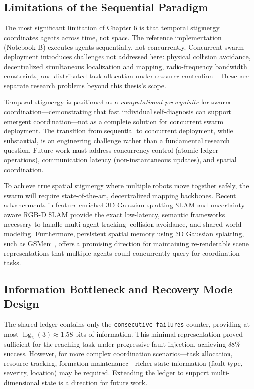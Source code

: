 \documentclass[12pt,a4paper,oneside]{report}
\begin{document}
\subsection{Limitations of the Sequential Paradigm}

The most significant limitation of Chapter 6 is that temporal stigmergy coordinates agents across time, not space. The reference implementation (Notebook B) executes agents sequentially, not concurrently. Concurrent swarm deployment introduces challenges not addressed here: physical collision avoidance, decentralized simultaneous localization and mapping, radio-frequency bandwidth constraints, and distributed task allocation under resource contention \cite{matsuki2024gaussian, keetha2024splattam}. These are separate research problems beyond this thesis's scope.

Temporal stigmergy is positioned as a \textit{computational prerequisite} for swarm coordination—demonstrating that fast individual self-diagnosis can support emergent coordination—not as a complete solution for concurrent swarm deployment. The transition from sequential to concurrent deployment, while substantial, is an engineering challenge rather than a fundamental research question. Future work must address concurrency control (atomic ledger operations), communication latency (non-instantaneous updates), and spatial coordination. 

To achieve true spatial stigmergy where multiple robots move together safely, the swarm will require state-of-the-art, decentralized mapping backbones. Recent advancements in feature-enriched 3D Gaussian splatting SLAM \cite{thirgood2025featureslam} and uncertainty-aware RGB-D SLAM \cite{tran2025varsplat} provide the exact low-latency, semantic frameworks necessary to handle multi-agent tracking, collision avoidance, and shared world-modeling. Furthermore, persistent spatial memory using 3D Gaussian splatting, such as GSMem \cite{lu2025gsmem}, offers a promising direction for maintaining re-renderable scene representations that multiple agents could concurrently query for coordination tasks.

\subsection{Information Bottleneck and Recovery Mode Design}

The shared ledger contains only the \texttt{consecutive\_failures} counter, providing at most $\log_2(3) \approx 1.58$ bits of information. This minimal representation proved sufficient for the reaching task under progressive fault injection, achieving 88\% success. However, for more complex coordination scenarios—task allocation, resource tracking, formation maintenance—richer state information (fault type, severity, location) may be required. Extending the ledger to support multi-dimensional state is a direction for future work.
\end{document}
